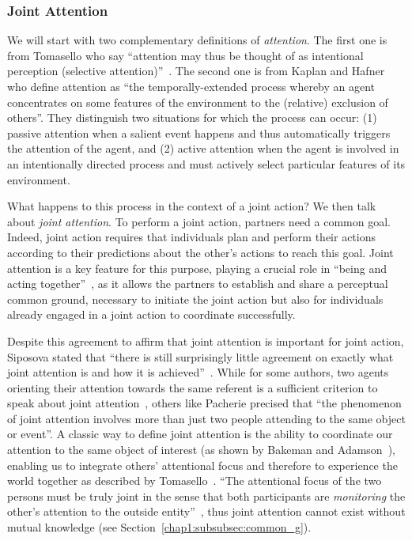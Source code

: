 \documentclass[a4paper,11pt,twoside]{StyleThese}
\begin{document}
\subsubsection{Joint Attention}\label{chap1:subsubsec:joint_att}
We will start with two complementary definitions of \emph{attention}. The first one is from Tomasello \etal{} who say ``attention may thus be thought of as intentional perception (selective attention)''~\cite{tomasello_2005_understanding}. The second one is from Kaplan and Hafner~\cite{kaplan_2006_challenges} who define attention as ``the temporally-extended process whereby an agent concentrates on some features of the environment to the (relative) exclusion of others''. They distinguish two situations for which the process can occur: (1) passive attention when a salient event happens and thus automatically triggers the attention of the agent, and (2) active attention when the agent is involved in an
intentionally directed process and must actively select particular features of its environment. 

What happens to this process in the context of a joint action? We then talk about \emph{joint attention}. To perform a joint action, partners need a common goal. Indeed, joint action requires that individuals plan and perform their actions according to their predictions about the other’s actions to reach this goal. Joint attention is a key feature for this purpose, playing a crucial role in ``being and acting together''~\cite{tomasello_2009_cultural}, as it allows the partners to establish and share a perceptual common ground, necessary to initiate the joint action but also for individuals already engaged in a joint action to coordinate successfully. 

Despite this agreement to affirm that joint attention is important for joint action, Siposova stated that ``there is still surprisingly little agreement on exactly what joint attention is and how it is achieved''~\cite{siposova_2019_new}. While for some authors, two agents orienting their attention towards the same referent is a sufficient criterion to speak about joint attention~\cite{butterworth_1991_minds}, others like Pacherie precised that ``the phenomenon of joint attention involves more than just two people attending to the same object or event''. A classic way to define joint attention is the ability to coordinate our attention to the same object of interest (\eg as shown by Bakeman and Adamson~\cite{bakeman_1984_coordinating}), enabling us to integrate others’ attentional focus and therefore to experience the world together as described by Tomasello~\cite{tomasello_2009_cultural}.  ``The attentional focus of the two persons must be truly joint in the sense that both participants are \emph{monitoring} the other's attention to the outside entity''~\cite[p.~106]{tomasello_1995_joint}, thus joint attention cannot exist without mutual knowledge (see Section~\ref{chap1:subsubsec:common_g}).
\end{document}
